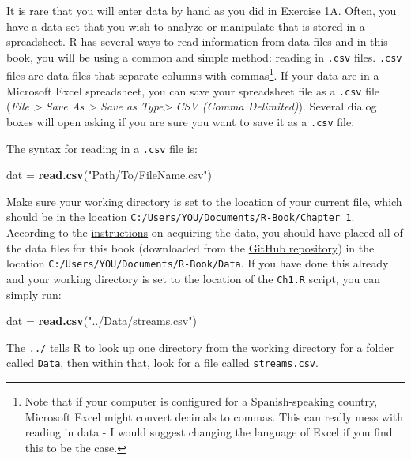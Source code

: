 \documentclass[]{book}
\newenvironment{Shaded}{\begin{snugshade}}{\end{snugshade}}
\newcommand{\KeywordTok}[1]{\textcolor[rgb]{0.13,0.29,0.53}{\textbf{#1}}}
\newcommand{\NormalTok}[1]{#1}
\newcommand{\StringTok}[1]{\textcolor[rgb]{0.31,0.60,0.02}{#1}}
\let\rmarkdownfootnote\footnote%
\def\footnote{\protect\rmarkdownfootnote}
\begin{document}
It is rare that you will enter data by hand as you did in Exercise 1A. Often, you have a data set that you wish to analyze or manipulate that is stored in a spreadsheet. R has several ways to read information from data files and in this book, you will be using a common and simple method: reading in \texttt{.csv} files. \texttt{.csv} files are data files that separate columns with commas\footnote{Note that if your computer is configured for a Spanish-speaking country, Microsoft Excel might convert decimals to commas. This can really mess with reading in data - I would suggest changing the language of Excel if you find this to be the case.}. If your data are in a Microsoft Excel spreadsheet, you can save your spreadsheet file as a \texttt{.csv} file (\emph{File \textgreater{} Save As \textgreater{} Save as Type\textgreater{} CSV (Comma Delimited)}). Several dialog boxes will open asking if you are sure you want to save it as a \texttt{.csv} file.

The syntax for reading in a \texttt{.csv} file is:

\begin{Shaded}
\begin{Highlighting}[]
\NormalTok{dat =}\StringTok{ }\KeywordTok{read.csv}\NormalTok{(}\StringTok{"Path/To/FileName.csv"}\NormalTok{)}
\end{Highlighting}
\end{Shaded}

Make sure your working directory is set to the location of your current file, which should be in the location \texttt{C:/Users/YOU/Documents/R-Book/Chapter\ 1}. According to the \protect\hyperlink{data-sets}{instructions} on acquiring the data, you should have placed all of the data files for this book (downloaded from the \href{}{GitHub repository}) in the location \texttt{C:/Users/YOU/Documents/R-Book/Data}. If you have done this already and your working directory is set to the location of the \texttt{Ch1.R} script, you can simply run:

\begin{Shaded}
\begin{Highlighting}[]
\NormalTok{dat =}\StringTok{ }\KeywordTok{read.csv}\NormalTok{(}\StringTok{"../Data/streams.csv"}\NormalTok{)}
\end{Highlighting}
\end{Shaded}

The \texttt{../} tells R to look up one directory from the working directory for a folder called \texttt{Data}, then within that, look for a file called \texttt{streams.csv}.
\end{document}

